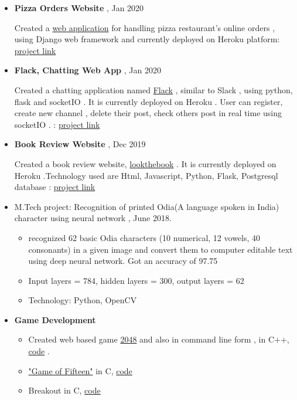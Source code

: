 \documentclass[a4paper,10pt]{article}
\begin{document}
	\begin{itemize}
	\item \textbf{Pizza Orders Website} , Jan 2020
	
	 Created a \href{https://pizzacs50w.herokuapp.com/}{web application} for handling pizza restaurant's online orders , using Django web framework and currently deployed on Heroku platform: \href{https://github.com/eelectron/pizza}{project link}
					
				\item \textbf{Flack, Chatting Web App} , Jan 2020 
				
				Created a chatting application named \href{https://flackthechat.herokuapp.com}{Flack} , similar to Slack , using python, flask and socketIO . It is currently deployed on Heroku . User can register, create new channel , delete their post, check others post in real time using socketIO . : \href{https://github.com/eelectron/flack}{project link} 
				
				\item \textbf{Book Review Website} , Dec 2019
				
				Created a book review website, \href{http://lookthebook.herokuapp.com}{lookthebook} . It is currently deployed on Heroku .Technology used are Html, Javascript, Python, Flask, Postgresql database : \href{https://github.com/eelectron/BookReview}{project link} 
				
				
				\item M.Tech project: Recognition of printed Odia(A language spoken in India) character using neural network , June 2018.
				\begin{itemize}
				    \item recognized 62 basic Odia characters (10 numerical, 12 vowels, 40 consonants) in a given image and convert them to computer editable text using deep neural network. Got an accuracy of 97.75
				    \item Input layers = 784, hidden layers = 300, output layers = 62
				    \item Technology: Python, OpenCV
				\end{itemize}
					
                			
				\item \textbf{Game Development} 
				    \begin{itemize}
				    \item 
				    Created web based game \href{https://gitlab.com/psonlinux/2048-game-web}{2048} and also in command line form , in C++, \href{https://gitlab.com/psonlinux/2048}{code} .
				        \item \href{https://en.wikipedia.org/wiki/15_puzzle}{"Game of Fifteen"} in C, \href{https://gitlab.com/psonlinux/game-of-fifteen}{code}
\item Breakout in C, \href{https://gitlab.com/psonlinux/breakout}{code}				    
				    \end{itemize}
			\end{itemize}
			
\end{document}
